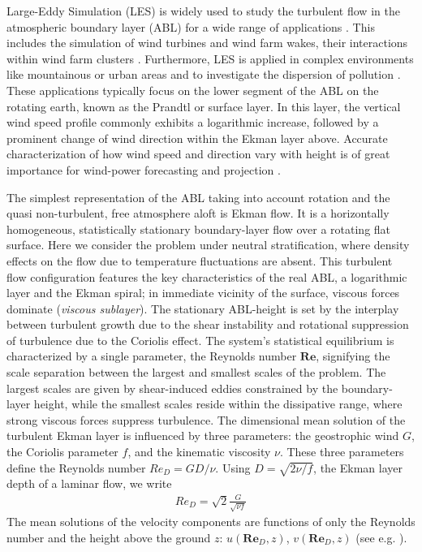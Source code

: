 \documentclass[smallcondensed,final]{svjour3}
\newcommand{\RE}{\mathbf{Re}}
\begin{document}
Large-Eddy Simulation (LES) is widely used to study the turbulent flow in the atmospheric boundary layer (ABL) for a wide range of applications \citep{stoll2020large}. This includes the simulation of wind turbines and wind farm wakes, their interactions within wind farm clusters \citep{porte2011large,mehta2014large,breton2017survey}. Furthermore, LES is applied in complex environments like mountainous or urban areas \citep{stoll2020large,garcia2018predictive} and to investigate the dispersion of pollution \citep{han2018large}. These applications typically focus on the lower segment of the ABL on the rotating earth, known as the Prandtl or surface layer. In this layer, the vertical wind speed profile commonly exhibits a logarithmic increase, followed by a prominent change of wind direction within the Ekman layer above. Accurate characterization of how wind speed and direction vary with height is of great importance for wind-power forecasting and projection \citep{optis2014moving}.

The simplest representation of the ABL taking into account rotation and the quasi non-turbulent, free atmosphere aloft is Ekman flow. It is a horizontally homogeneous, statistically stationary boundary-layer flow over a rotating flat surface. Here we consider the problem under neutral stratification, where density effects on the flow due to temperature fluctuations are absent. This turbulent flow configuration features the key characteristics of the real ABL, a logarithmic layer and the Ekman spiral; in immediate vicinity of the surface, viscous forces dominate (\emph{viscous sublayer}). The stationary ABL-height is set by the interplay between turbulent growth due to the shear instability \citep{lilly1966instability} and rotational suppression of turbulence due to the Coriolis effect. The system's statistical equilibrium is characterized by a single parameter, the Reynolds number $\RE$, signifying the scale separation between the largest and smallest scales of the problem. The largest scales are given by shear-induced eddies constrained by the boundary-layer height, while the smallest scales reside within the dissipative range, where strong viscous forces suppress turbulence. The dimensional mean solution of the turbulent Ekman layer is influenced by three parameters: the geostrophic wind $G$, the Coriolis parameter $f$, and the kinematic viscosity $\nu$. These three parameters define the Reynolds number $Re_D = GD/\nu$. Using $D=\sqrt{2\nu/f}$, the Ekman layer depth of a laminar flow, we write
%
\begin{align}\label{red}
 Re_D = \sqrt{2}\frac{G}{\sqrt{\nu f}}
\end{align}
%
The mean solutions of the velocity components are functions of only the Reynolds number and the height above the ground $z$: $u(\RE_D,z)$, $v(\RE_D,z)$ (see e.g. \cite{csanady1967resistance}).
\end{document}
